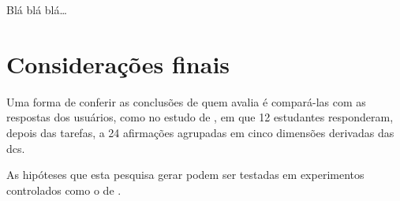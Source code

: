 Blá blá blá…
\section{Considerações finais}
\label{sec:consideracoes-finais}
Uma forma de conferir as conclusões de quem avalia é compará-las com as
respostas dos usuários, como no
estudo de \textcite[p. 1512-1513 e 1519]{zimmerle2025}, em que 12 estudantes
responderam, depois das tarefas, a 24 afirmações agrupadas em cinco
dimensões derivadas das \glspl{dc}.

As hipóteses que esta pesquisa gerar podem ser testadas em experimentos
controlados como o de \textcite{salvaneschi2017}.
